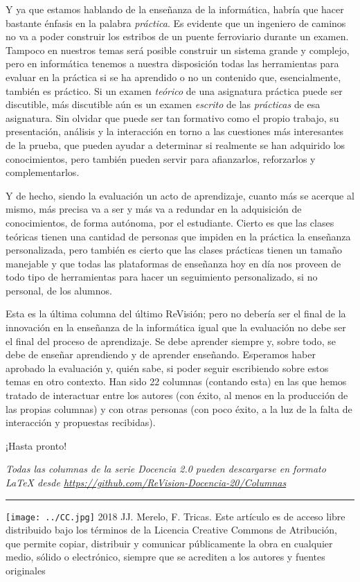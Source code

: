 \documentclass[twoside,10pt]{article}
\newcommand{\surl}[1]{{\small\url{#1}}}
\begin{document}
\begin{multicols}{2}
Y ya que estamos hablando de la enseñanza de la informática, habría
que hacer bastante énfasis en la palabra {\em práctica}. Es evidente
que un ingeniero de caminos no va a poder construir los estribos de un
puente ferroviario durante un examen. Tampoco en nuestros temas será posible construir un sistema grande y complejo, pero en informática tenemos a
nuestra disposición todas las herramientas para evaluar en la práctica
si se ha aprendido o no un contenido que, esencialmente, también es
práctico. 
Si un examen {\em teórico} de una asignatura práctica puede ser discutible, más
discutible aún es un examen {\em escrito} de las {\em prácticas} de esa
asignatura.
Sin olvidar que puede ser tan formativo como el propio trabajo, su
presentación, análisis y la interacción en torno a las cuestiones más
interesantes de la prueba, que pueden ayudar a determinar si realmente se han
adquirido los conocimientos, pero también pueden servir para afianzarlos,
reforzarlos y complementarlos.

Y de hecho, siendo la evaluación un acto de aprendizaje, cuanto más se
acerque al mismo, más precisa va a ser y más va a redundar en la
adquisición de conocimientos, de forma autónoma, por el
estudiante. Cierto es que las clases teóricas tienen una cantidad de
personas que impiden en la práctica la enseñanza personalizada, pero
también es cierto que las clases prácticas tienen un tamaño manejable
y que todas las plataformas de enseñanza hoy en día nos proveen de
todo tipo de herramientas para hacer un seguimiento personalizado, si
no personal, de los alumnos.

Esta es la última columna del último ReVisión; pero no debería ser el
final de la innovación en la enseñanza de la informática igual que la
evaluación no debe ser el final del proceso de aprendizaje. Se debe
aprender siempre y, sobre todo, se debe de enseñar aprendiendo y de
aprender enseñando.
Esperamos haber aprobado la evaluación y, quién sabe, si poder seguir escribiendo sobre estos temas en otro contexto. Han sido 22 columnas (contando esta) en las que hemos tratado de interactuar entre los autores (con éxito, al menos en la producción de las propias columnas) y con otras personas (con poco éxito, a la luz de la falta de interacción y propuestas recibidas). 

¡Hasta pronto!

\noindent\emph{Todas las columnas de la serie Docencia 2.0
pueden descargarse en formato LaTeX desde
\surl{https://github.com/ReVision-Docencia-20/Columnas}}

\noindent\rule{90mm}{1pt}

{\small \noindent\texttt{[image: ../CC.jpg]} 2018 JJ. Merelo, F. Tricas. Este artículo es de acceso libre distribuido bajo los términos
de la Licencia Creative Commons de Atribución, que permite copiar,
distribuir y comunicar públicamente la obra en cualquier medio, sólido
o electrónico, siempre que se acrediten a los autores y fuentes
originales}

\end{multicols}
\end{document}
